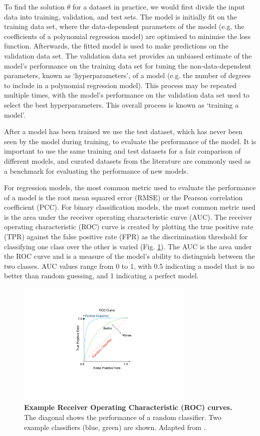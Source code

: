 To find the solution $\hat{\theta}$ for a dataset in practice, we would first divide the input data into training, validation, and test sets. The model is initially fit on the training data set, where the data-dependent parameters of the model (e.g. the coefficients of a polynomial regression model) are optimised to minimise the loss function. Afterwards, the fitted model is used to make predictions on the validation data set. The validation data set provides an unbiased estimate of the model's performance on the training data set for tuning the non-data-dependent parameters, known as `hyperparameters', of a model (e.g. the number of degrees to include in a polynomial regression model). This process may be repeated multiple times, with the model's performance on the validation data set used to select the best hyperparameters. This overall process is known as `training a model'.

After a model has been trained we use the test dataset, which has never been seen by the model during training, to evaluate the performance of the model. It is important to use the same training and test datasets for a fair comparison of different models, and curated datasets from the literature are commonly used as a benchmark for evaluating the performance of new models.

For regression models, the most common metric used to evaluate the performance of a model is the root mean squared error (RMSE) or the Pearson correlation coefficient (PCC). For binary classification models, the most common metric used is the area under the receiver operating characteristic curve (AUC). The receiver operating characteristic (ROC) curve is created by plotting the true positive rate (TPR) against the false positive rate (FPR) as the discrimination threshold for classifying one class over the other is varied (Fig. \ref{fig:roc_curve}). The AUC is the area under the ROC curve and is a measure of the model's ability to distinguish between the two classes. AUC values range from 0 to 1, with 0.5 indicating a model that is no better than random guessing, and 1 indicating a perfect model.

\begin{figure}[!h] 
 \centering 
 \includegraphics[width=0.75\textwidth]{Chapters/Background/Figs/roc_curve.pdf}
 \caption{\textbf{Example Receiver Operating Characteristic (ROC) curves.} The diagonal shows the performance of a random classifier. Two example classifiers (blue, green) are shown. Adapted from \cite{roccurve}.}
 \label{fig:roc_curve}
\end{figure}

